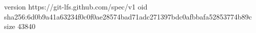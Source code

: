 version https://git-lfs.github.com/spec/v1
oid sha256:6d0b9a41a63234f0c0f0ae28574bad71adc271397bdc0afbbafa52853774b89c
size 43840
